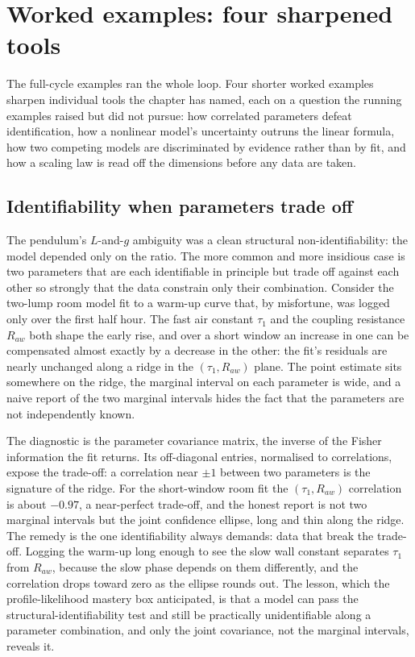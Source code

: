 \section{Worked examples: four sharpened tools}

The full-cycle examples ran the whole loop. Four shorter worked examples
sharpen individual tools the chapter has named, each on a question the
running examples raised but did not pursue: how correlated parameters
defeat identification, how a nonlinear model's uncertainty outruns the
linear formula, how two competing models are discriminated by evidence
rather than by fit, and how a scaling law is read off the dimensions before
any data are taken.

\subsection{Identifiability when parameters trade off}

The pendulum's $L$-and-$g$ ambiguity was a clean structural
non-identifiability: the model depended only on the ratio. The more common
and more insidious case is two parameters that are each identifiable in
principle but trade off against each other so strongly that the data
constrain only their combination. Consider the two-lump room model fit to a
warm-up curve that, by misfortune, was logged only over the first half
hour. The fast air constant $\tau_1$ and the coupling resistance $R_{aw}$
both shape the early rise, and over a short window an increase in one can
be compensated almost exactly by a decrease in the other: the fit's
residuals are nearly unchanged along a ridge in the $(\tau_1, R_{aw})$
plane. The point estimate sits somewhere on the ridge, the marginal
interval on each parameter is wide, and a naive report of the two marginal
intervals hides the fact that the parameters are not independently known.

The diagnostic is the parameter covariance matrix, the inverse of the
Fisher information the fit returns. Its off-diagonal entries, normalised to
correlations, expose the trade-off: a correlation near $\pm 1$ between two
parameters is the signature of the ridge. For the short-window room fit the
$(\tau_1, R_{aw})$ correlation is about $-0.97$, a near-perfect trade-off,
and the honest report is not two marginal intervals but the joint
confidence ellipse, long and thin along the ridge. The remedy is the one
identifiability always demands: data that break the trade-off. Logging the
warm-up long enough to see the slow wall constant separates $\tau_1$ from
$R_{aw}$, because the slow phase depends on them differently, and the
correlation drops toward zero as the ellipse rounds out. The lesson, which
the profile-likelihood mastery box anticipated, is that a model can pass
the structural-identifiability test and still be practically
unidentifiable along a parameter combination, and only the joint
covariance, not the marginal intervals, reveals it.

